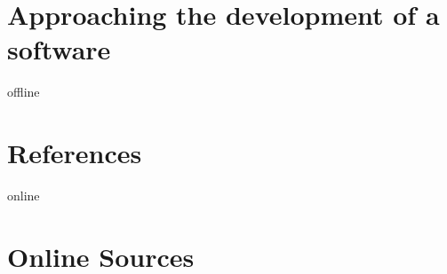 \documentclass[12pt,a4paper]{report}
\begin{document}
\section{Approaching the development of a software}




\newpage



\begin{btSect}{offline}
\section*{References}
\btPrintCited
\end{btSect}
\begin{btSect}{online}
\section*{Online Sources}
\btPrintCited
\end{btSect}
\end{document}
